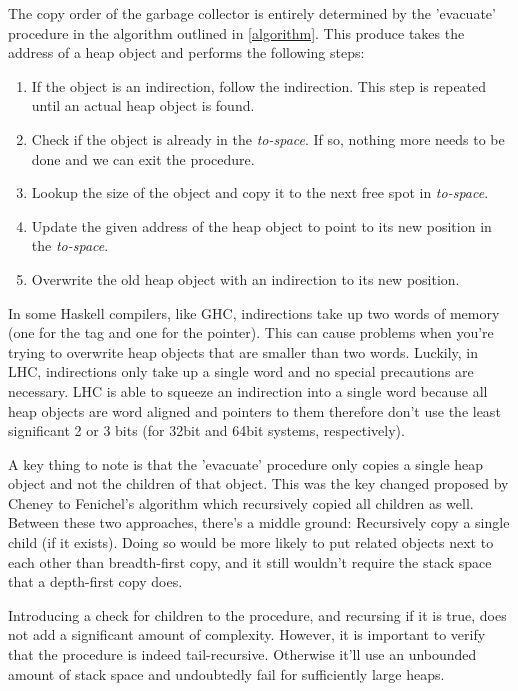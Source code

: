 \documentclass[a4paper,oneside]{memoir}
\begin{document}
The copy order of the garbage collector is entirely determined by the 'evacuate'
procedure in the algorithm outlined in \ref{algorithm}. This produce takes the
address of a heap object and performs the following steps:
\begin{enumerate}
  \item If the object is an indirection, follow the indirection. This step is
  repeated until an actual heap object is found.
  \item Check if the object is already in the \emph{to-space}. If so, nothing
  more needs to be done and we can exit the procedure.
  \item Lookup the size of the object and copy it to the next free spot in
  \emph{to-space}.
  \item Update the given address of the heap object to point to its new position
  in the \emph{to-space}.
  \item Overwrite the old heap object with an indirection to its new position.
\end{enumerate}

In some Haskell compilers, like GHC, indirections take up two words of memory
(one for the tag and one for the pointer). This can cause problems when you're
trying to overwrite heap objects that are smaller than two words. Luckily, in
LHC, indirections only take up a single word and no special precautions are
necessary. LHC is able to squeeze an indirection into a single word because
all heap objects are word aligned and pointers to them therefore don't use the
least significant 2 or 3 bits (for 32bit and 64bit systems, respectively).

A key thing to note is that the 'evacuate' procedure only copies a single heap
object and not the children of that object. This was the key changed proposed
by Cheney to Fenichel's algorithm which recursively copied all children as well.
\cite{Fenichel,Cheney:1970} Between these two approaches, there's a middle
ground: Recursively copy a single child (if it exists). Doing so would be more
likely to put related objects next to each other than breadth-first copy, and
it still wouldn't require the stack space that a depth-first copy does.

Introducing a check for children to the procedure, and recursing if it is true,
does not add a significant amount of complexity. However, it is important to
verify that the procedure is indeed tail-recursive. Otherwise it'll use an
unbounded amount of stack space and undoubtedly fail for sufficiently large
heaps.
\end{document}
